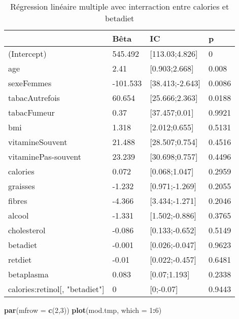 \documentclass[]{article}
\newenvironment{Shaded}{\begin{snugshade}}{\end{snugshade}}
\newcommand{\KeywordTok}[1]{\textcolor[rgb]{0.13,0.29,0.53}{\textbf{#1}}}
\newcommand{\DataTypeTok}[1]{\textcolor[rgb]{0.13,0.29,0.53}{#1}}
\newcommand{\DecValTok}[1]{\textcolor[rgb]{0.00,0.00,0.81}{#1}}
\newcommand{\OperatorTok}[1]{\textcolor[rgb]{0.81,0.36,0.00}{\textbf{#1}}}
\newcommand{\NormalTok}[1]{#1}
\begin{document}
\begin{table}

\caption{\label{tab:unnamed-chunk-74}Régression linéaire multiple avec interraction entre calories et betadiet}
\centering
\begin{tabular}[t]{l|l|l|l}
\hline
  & Bêta & IC & p\\
\hline
\rowcolor[HTML]{BBD2E1}  (Intercept) & 545.492 & [113.03;4.826] & 0\\
\hline
age & 2.41 & [0.903;2.668] & 0.008\\
\hline
\rowcolor[HTML]{BBD2E1}  sexeFemmes & -101.533 & [38.413;-2.643] & 0.0086\\
\hline
tabacAutrefois & 60.654 & [25.666;2.363] & 0.0188\\
\hline
\rowcolor[HTML]{BBD2E1}  tabacFumeur & 0.37 & [37.457;0.01] & 0.9921\\
\hline
bmi & 1.318 & [2.012;0.655] & 0.5131\\
\hline
\rowcolor[HTML]{BBD2E1}  vitamineSouvent & 21.488 & [28.507;0.754] & 0.4516\\
\hline
vitaminePas-souvent & 23.239 & [30.698;0.757] & 0.4496\\
\hline
\rowcolor[HTML]{BBD2E1}  calories & 0.072 & [0.068;1.047] & 0.2959\\
\hline
graisses & -1.232 & [0.971;-1.269] & 0.2055\\
\hline
\rowcolor[HTML]{BBD2E1}  fibres & -4.366 & [3.434;-1.271] & 0.2046\\
\hline
alcool & -1.331 & [1.502;-0.886] & 0.3765\\
\hline
\rowcolor[HTML]{BBD2E1}  cholesterol & -0.086 & [0.133;-0.652] & 0.5149\\
\hline
betadiet & -0.001 & [0.026;-0.047] & 0.9623\\
\hline
\rowcolor[HTML]{BBD2E1}  retdiet & -0.01 & [0.022;-0.457] & 0.6481\\
\hline
betaplasma & 0.083 & [0.07;1.193] & 0.2338\\
\hline
\rowcolor[HTML]{BBD2E1}  calories:retinol[, "betadiet"] & 0 & [0;-0.07] & 0.9443\\
\hline
\end{tabular}
\end{table}

\begin{Shaded}
\begin{Highlighting}[]
\KeywordTok{par}\NormalTok{(}\DataTypeTok{mfrow =} \KeywordTok{c}\NormalTok{(}\DecValTok{2}\NormalTok{,}\DecValTok{3}\NormalTok{))}
\KeywordTok{plot}\NormalTok{(mod.tmp, }\DataTypeTok{which =} \DecValTok{1}\OperatorTok{:}\DecValTok{6}\NormalTok{)}
\end{Highlighting}
\end{Shaded}
\end{document}
